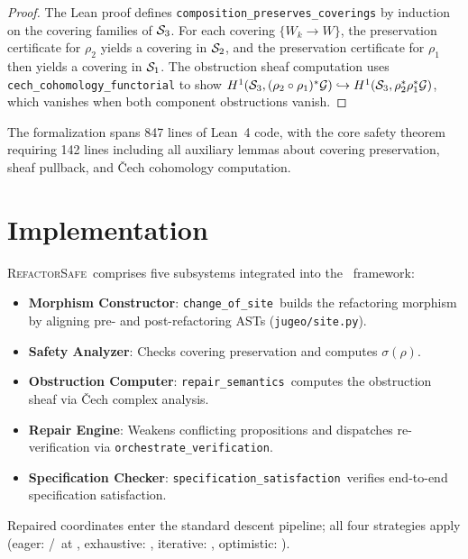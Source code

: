 \documentclass[11pt]{article}
\newcommand{\RefactorSafe}{\textsc{RefactorSafe}}
\newcommand{\ChangeOfSite}{\texttt{change\_of\_site}}
\newcommand{\RepairSem}{\texttt{repair\_semantics}}
\newcommand{\SpecSat}{\texttt{specification\_satisfaction}}
\newcommand{\RefactorMorph}{\rho}
\begin{document}
\begin{proof}
The Lean proof defines \texttt{composition\_preserves\_coverings}
by induction on the covering families of $\mathcal{S}_3$.  For each covering
$\{W_k \to W\}$, the preservation certificate for $\RefactorMorph_2$
yields a covering in $\mathcal{S}_2$, and the preservation certificate for
$\RefactorMorph_1$ then yields a covering in $\mathcal{S}_1$.  The
obstruction sheaf computation uses \texttt{cech\_cohomology\_functorial}
to show $\Hcoh{1}(\Site_3, (\RefactorMorph_2 \circ
\RefactorMorph_1)^*\mathcal{G}) \hookrightarrow
\Hcoh{1}(\Site_3, \RefactorMorph_2^*\RefactorMorph_1^*\mathcal{G})$,
which vanishes when both component obstructions vanish.
\end{proof}

The formalization spans 847 lines of Lean~4 code, with the core safety
theorem requiring 142 lines including all auxiliary lemmas about
covering preservation, sheaf pullback, and Čech cohomology computation.

\section{Implementation}\label{sec:implementation}

\RefactorSafe\ comprises five subsystems integrated into the \JuGeo\
framework:
\begin{itemize}[noitemsep]
  \item \textbf{Morphism Constructor}: \ChangeOfSite\ builds the
        refactoring morphism by aligning pre- and post-refactoring ASTs
        (\texttt{jugeo/site.py}).
  \item \textbf{Safety Analyzer}: Checks covering preservation and
        computes $\sigma(\RefactorMorph)$.
  \item \textbf{Obstruction Computer}: \RepairSem\ computes the
        obstruction sheaf via Čech complex analysis.
  \item \textbf{Repair Engine}: Weakens conflicting propositions and
        dispatches re-verification via
        \texttt{orchestrate\_verification}.
  \item \textbf{Specification Checker}: \SpecSat\ verifies end-to-end
        specification satisfaction.
\end{itemize}
Repaired coordinates enter the standard descent pipeline; all four strategies apply (eager: \compDescentEagerSuccesses/\compDescentEagerRuns\ at \compDescentEagerRate, exhaustive: \compDescentExhaustiveRate, iterative: \compDescentIterativeRate, optimistic: \compDescentOptimisticRate).
\end{document}
